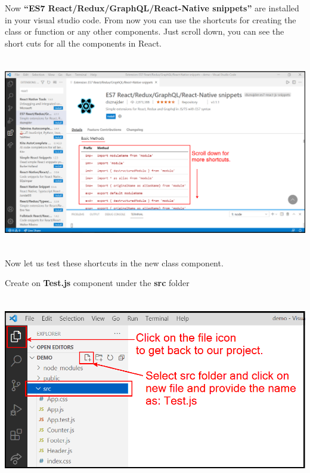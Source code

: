 \documentclass{article}
\begin{document}
\noindent 

\noindent Now \textbf{``ES7 React/Redux/GraphQL/React-Native snippets''} are installed in your visual studio code. From now you can use the shortcuts for creating the class or function or any other components. Just scroll down, you can see the short cuts for all the components in React.

\noindent 

\begin{center}
	\noindent \textbf{\includegraphics*[width=6.05in, height=3.29in]{IMG-07-03}}
\end{center}

\noindent 

\noindent 

\noindent Now let us test these shortcuts in the new class component.

\noindent Create on \textbf{Test.js} component under the \textbf{src} folder

\begin{center}
	\noindent \includegraphics*[width=6.15in, height=3.22in]{IMG-07-04}
\end{center}
\end{document}

